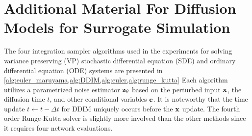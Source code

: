 \chapter{Additional Material For Diffusion Models for Surrogate Simulation}
\label{app:jet_generation}

The four integration sampler algorithms used in the \pcjedi experiments for solving variance preserving (VP) stochastic differential equation (SDE) and ordinary differential equation (ODE) systems are presented in \cref{alg:euler_maruyama,alg:DDIM,alg:euler,alg:runge_kutta}
Each algorithm utilizes a parametrized noise estimator $\mathbf{z}_\theta$ based on the perturbed input $\mathbf{x}$, the diffusion time $t$, and other conditional variables $\mathbf{c}$.
It is noteworthy that the time update $t \gets t - \Delta t$ for DDIM uniquely occurs before the $\mathbf{x}$ update.
The fourth order Runge-Kutta solver is slightly more involved than the other methods since it requires four network evaluations.

